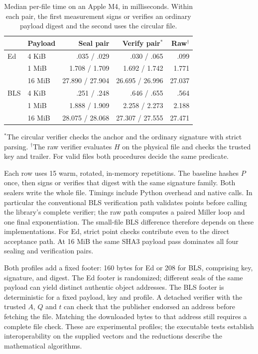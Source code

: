 \documentclass[10pt,twocolumn,letterpaper]{article}
\begin{document}
\begin{table}[ht]
\centering
\caption{Median per-file time on an Apple M4, in milliseconds. Within each pair, the first measurement signs or verifies an ordinary payload digest and the second uses the circular file.}
\small
\setlength{\tabcolsep}{3pt}\begin{tabular}{@{}llrrr@{}}
\toprule
 & Payload & Seal pair & Verify pair$^*$ & Raw$^\dagger$\\
\midrule
Ed & 4 KiB & .035 / .029 & .030 / .065 & .099\\
   & 1 MiB & 1.708 / 1.709 & 1.692 / 1.742 & 1.771\\
   & 16 MiB & 27.890 / 27.904 & 26.695 / 26.996 & 27.037\\
BLS & 4 KiB & .251 / .248 & .646 / .655 & .564\\
    & 1 MiB & 1.888 / 1.909 & 2.258 / 2.273 & 2.188\\
    & 16 MiB & 28.075 / 28.068 & 27.307 / 27.555 & 27.471\\
\bottomrule
\end{tabular}
\par\smallskip\raggedright\footnotesize
$^*$The circular verifier checks the anchor and the ordinary signature with strict parsing. $^\dagger$The raw verifier evaluates $H$ on the physical file and checks the trusted key and trailer. For valid files both procedures decide the same predicate.
\end{table}

Each row uses 15 warm, rotated, in-memory repetitions. The baseline hashes $P$ once, then signs or verifies that digest with the same signature family. Both sealers write the whole file. Timings include Python overhead and native calls. In particular the conventional BLS verification path validates points before calling the library's complete verifier; the raw path computes a paired Miller loop and one final exponentiation. The small-file BLS difference therefore depends on these implementations. For Ed, strict point checks contribute even to the direct acceptance path. At 16 MiB the same SHA3 payload pass dominates all four sealing and verification pairs.

Both profiles add a fixed footer: 160 bytes for Ed or 208 for BLS, comprising key, signature, and digest. The Ed footer is randomized; different seals of the same payload can yield distinct authentic object addresses. The BLS footer is deterministic for a fixed payload, key and profile. A detached verifier with the trusted $A$, $Q$ and $t$ can check that the publisher endorsed an address before fetching the file. Matching the downloaded bytes to that address still requires a complete file check. These are experimental profiles; the executable tests establish interoperability on the supplied vectors and the reductions describe the mathematical algorithms.
\end{document}
